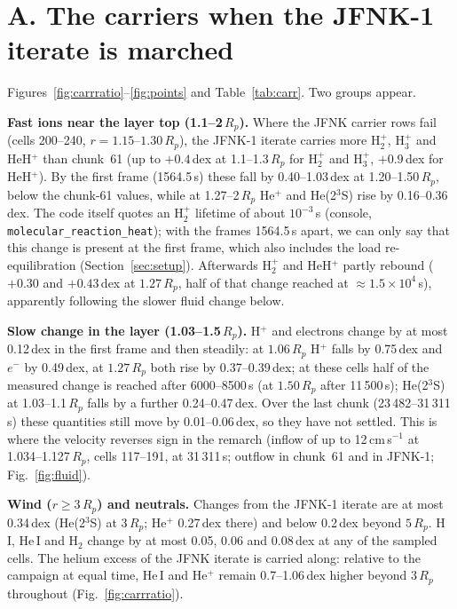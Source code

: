 \documentclass[english,a4paper]{my_memo}
\newcommand{\Rp}{R_p}
\begin{document}
\section{A. The carriers when the JFNK-1 iterate is marched}\label{sec:a}

Figures~\ref{fig:carrratio}--\ref{fig:points} and
Table~\ref{tab:carr}. Two groups appear.

\textbf{Fast ions near the layer top (1.1--2\,$\Rp$).} Where the JFNK
carrier rows fail (cells 200--240, $r=1.15$--$1.30\,\Rp$), the JFNK-1
iterate carries more H$_2^+$, H$_3^+$ and HeH$^+$ than chunk~61 (up to
$+0.4$\,dex at 1.1--1.3\,$\Rp$ for H$_2^+$ and H$_3^+$, $+0.9$\,dex for
HeH$^+$). By the first frame (1564.5\,s) these fall by 0.40--1.03\,dex at
1.20--1.50\,$\Rp$, below the chunk-61 values, while at 1.27--2\,$\Rp$ He$^+$
and He(2$^3$S) rise by 0.16--0.36\,dex. The code itself quotes an H$_2^+$ lifetime of
about $10^{-3}$\,s (console, \texttt{molecular\_reaction\_heat}); with the
frames 1564.5\,s apart, we can only say that this change is present at
the first frame, which also includes the load re-equilibration
(Section~\ref{sec:setup}). Afterwards H$_2^+$ and HeH$^+$ partly rebound
($+0.30$ and $+0.43$\,dex at $1.27\,\Rp$, half of that change reached at
$\approx1.5\times10^{4}$\,s), apparently following the slower fluid change
below.

\textbf{Slow change in the layer (1.03--1.5\,$\Rp$).} H$^+$ and electrons
change by at most 0.12\,dex in the first frame and then steadily: at
$1.06\,\Rp$ H$^+$ falls by 0.75\,dex and $e^-$ by 0.49\,dex, at
$1.27\,\Rp$ both rise by 0.37--0.39\,dex; at these cells half of the
measured change is reached after 6000--8500\,s (at $1.50\,\Rp$ after
11\,500\,s); He(2$^3$S) at 1.03--1.1\,$\Rp$ falls by a further
0.24--0.47\,dex. Over the last chunk (23\,482--31\,311\,s) these quantities
still move by 0.01--0.06\,dex, so they have not settled. This is where the
velocity reverses sign in the remarch (inflow of up to 12\,cm\,s$^{-1}$ at
1.034--1.127\,$\Rp$, cells 117--191, at 31\,311\,s; outflow in chunk~61 and in JFNK-1;
Fig.~\ref{fig:fluid}).

\textbf{Wind ($r\ge3\,\Rp$) and neutrals.} Changes from the JFNK-1 iterate
are at most 0.34\,dex (He(2$^3$S) at $3\,\Rp$; He$^+$ 0.27\,dex there) and
below 0.2\,dex beyond $5\,\Rp$. H\,I, He\,I and H$_2$ change by at most
0.05, 0.06 and 0.08\,dex at any of the sampled cells. The helium excess of the JFNK
iterate is carried along: relative to the campaign at equal time, He\,I and
He$^+$ remain 0.7--1.06\,dex higher beyond $3\,\Rp$ throughout
(Fig.~\ref{fig:carrratio}).
\end{document}
